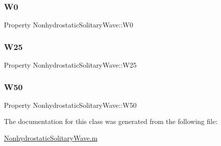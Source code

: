 \subsubsection{\texorpdfstring{W0}{W0}}
{\footnotesize\ttfamily Property Nonhydrostatic\+Solitary\+Wave\+::\+W0}

\mbox{\label{class_nonhydrostatic_solitary_wave_ab248794c0f19cbe94ee898e76ac74ee5}} 
\subsubsection{\texorpdfstring{W25}{W25}}
{\footnotesize\ttfamily Property Nonhydrostatic\+Solitary\+Wave\+::\+W25}

\mbox{\label{class_nonhydrostatic_solitary_wave_a924166bee67299f3a6420ad2534a4d70}} 
\subsubsection{\texorpdfstring{W50}{W50}}
{\footnotesize\ttfamily Property Nonhydrostatic\+Solitary\+Wave\+::\+W50}



The documentation for this class was generated from the following file\+:\begin{DoxyCompactItemize}
\item 
\hyperlink{_nonhydrostatic_solitary_wave_8m}{Nonhydrostatic\+Solitary\+Wave.\+m}\end{DoxyCompactItemize}

